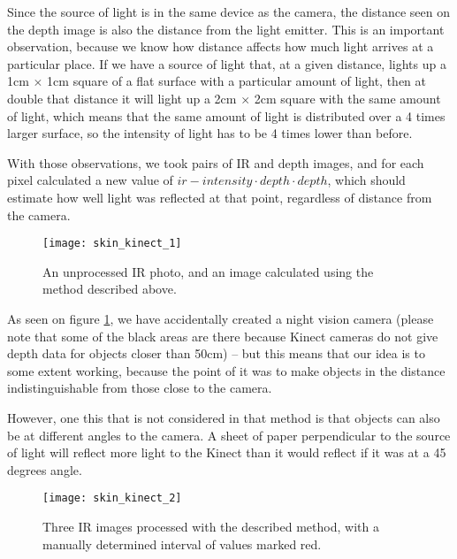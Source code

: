             Since the source of light is in the same device as the camera, the distance
            seen on the depth image is also the distance from the light emitter.
            This is an important observation, because we know how distance affects how
            much light arrives at a particular place. %
            If we have a source of light that, at a given distance, lights up a
            1cm $\times$ 1cm square of a flat surface with a particular amount
            of light, then at double that distance it will light up a 2cm $\times$ 2cm
            square with the same amount of light, which means that the same amount
            of light is distributed over a 4 times larger surface, so the
            intensity of light has to be 4 times lower than before.

            With those observations, we took pairs of IR and depth images, and for each
            pixel calculated a new value of $ir-intensity \cdot depth \cdot depth$,
            which should estimate how well light was reflected at that point,
            regardless of distance from the camera.

            \begin{figure}[H]
                \caption{An unprocessed IR photo, and an image calculated using
                the method described above.}
                \centering
                \texttt{[image: skin\_kinect\_1]}
                \label{fig:skin_kinect_1}
            \end{figure}

            As seen on figure \ref{fig:skin_kinect_1}, we have accidentally created
            a night vision camera (please note that some of the black areas are there because Kinect cameras do not give depth data for objects closer than 50cm)
            -- but this means that our idea is to some extent working, because the point
            of it was to make objects in the distance indistinguishable from those close
            to the camera.

            However, one this that is not considered in that method is that objects
            can also be at different angles to the camera.
            A sheet of paper perpendicular to the source of light will reflect more
            light to the Kinect than it would reflect if it was at a 45 degrees angle.

            \begin{figure}[H]
                \caption{Three IR images processed with the described method, with a
                manually determined interval of values marked red.}
                \centering
                \texttt{[image: skin\_kinect\_2]}
                \label{fig:skin_kinect_2}
            \end{figure}

